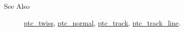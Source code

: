 \begin{description}
  \item[See Also]
    \href{../ptc_twiss/ptc_twiss.html}{ptc\_twiss},
    \href{../ptc_normal/ptc_normal.html}{ptc\_normal},
    \href{../ptc_track/ptc_track.html}{ ptc\_track},
    \href{../ptc_track_line/ptc_track_line.html}{ptc\_track\_line}. 
\end{description}



